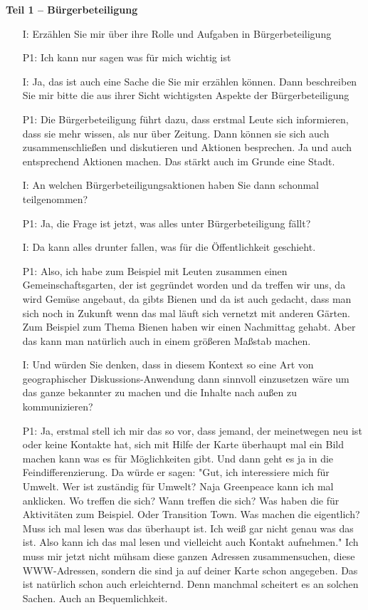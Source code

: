 \textbf{Teil 1 -- B{\"u}rgerbeteiligung}
\begin{itemize}
    \item[I:] Erz{\"a}hlen Sie mir {\"u}ber ihre Rolle und Aufgaben in B{\"u}rgerbeteiligung
    \item[P1:] Ich kann nur sagen was f{\"u}r mich wichtig ist
    \item[I:] Ja, das ist auch eine Sache die Sie mir erz{\"a}hlen k{\"o}nnen. Dann beschreiben Sie mir bitte die aus ihrer Sicht wichtigsten Aspekte der B{\"u}rgerbeteiligung
    \item[P1:] Die B{\"u}rgerbeteiligung f{\"u}hrt dazu, dass erstmal Leute sich informieren, dass sie mehr wissen, als nur {\"u}ber Zeitung. Dann k{\"o}nnen sie sich auch zusammenschlie{\ss}en und diskutieren und Aktionen besprechen. Ja und auch entsprechend Aktionen machen. Das st{\"a}rkt auch im Grunde eine Stadt.
    \item[I:] An welchen B{\"u}rgerbeteiligungsaktionen haben Sie dann schonmal teilgenommen?
	\item[P1:] Ja, die Frage ist jetzt, was alles unter B{\"u}rgerbeteiligung f{\"a}llt?
	\item[I:] Da kann alles drunter fallen, was f{\"u}r die {\"O}ffentlichkeit geschieht.
	\item[P1:] Also, ich habe zum Beispiel mit Leuten zusammen einen Gemeinschaftsgarten, der ist gegr{\"u}ndet worden und da treffen wir uns, da wird Gem{\"u}se angebaut, da gibts Bienen und da ist auch gedacht, dass man sich noch in Zukunft wenn das mal l{\"a}uft sich vernetzt mit anderen G{\"a}rten. Zum Beispiel zum Thema Bienen haben wir einen Nachmittag gehabt. Aber das kann man nat{\"u}rlich auch in einem gr{\"o}{\ss}eren Ma{\ss}stab machen.
	\item[I:] Und w{\"u}rden Sie denken, dass in diesem Kontext so eine Art von geographischer Diskussions-Anwendung dann sinnvoll einzusetzen w{\"a}re um das ganze bekannter zu machen und die Inhalte nach au{\ss}en zu kommunizieren?
	\item[P1:] Ja, erstmal stell ich mir das so vor, dass jemand, der meinetwegen neu ist oder keine Kontakte hat, sich mit Hilfe der Karte {\"u}berhaupt mal ein Bild machen kann was es f{\"u}r M{\"o}glichkeiten gibt. Und dann geht es ja in die Feindifferenzierung. Da w{\"u}rde er sagen: "Gut, ich interessiere mich f{\"u}r Umwelt. Wer ist zust{\"a}ndig f{\"u}r Umwelt? Naja Greenpeace kann ich mal anklicken. Wo treffen die sich? Wann treffen die sich? Was haben die f{\"u}r Aktivit{\"a}ten zum Beispiel. Oder Transition Town. Was machen die eigentlich? Muss ich mal lesen was das {\"u}berhaupt ist. Ich wei{\ss} gar nicht genau was das ist. Also kann ich das mal lesen und vielleicht auch Kontakt aufnehmen." Ich muss mir jetzt nicht m{\"u}hsam diese ganzen Adressen zusammensuchen, diese WWW-Adressen, sondern die sind ja auf deiner Karte schon angegeben. Das ist nat{\"u}rlich schon auch erleichternd. Denn manchmal scheitert es an solchen Sachen. Auch an Bequemlichkeit.

\end{itemize}
